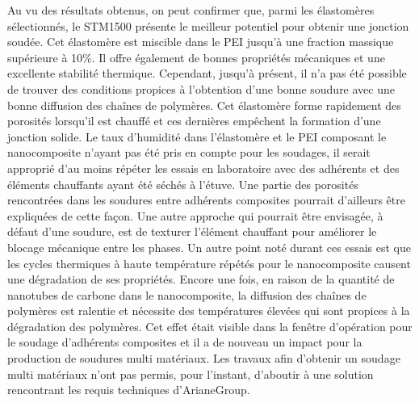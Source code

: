 Au vu des résultats obtenus, on peut confirmer que, parmi les élastomères sélectionnés, le STM1500 présente le meilleur potentiel pour obtenir une jonction soudée. 
Cet élastomère est miscible dans le PEI jusqu'à une fraction massique supérieure à 10\%. 
Il offre également de bonnes propriétés mécaniques et une excellente stabilité thermique. 
Cependant, jusqu'à présent, il n'a pas été possible de trouver des conditions propices à l'obtention d'une bonne soudure avec une bonne diffusion des chaînes de polymères. 
Cet élastomère forme rapidement des porosités lorsqu'il est chauffé et ces dernières empêchent la formation d'une jonction solide. 
Le taux d'humidité dans l'élastomère et le PEI composant le nanocomposite n'ayant pas été pris en compte pour les soudages, il serait approprié d'au moins répéter les essais en laboratoire avec des adhérents et des éléments chauffants ayant été séchés à l'étuve. 
Une partie des porosités rencontrées dans les soudures entre adhérents composites pourrait d'ailleurs être expliquées de cette façon. 
Une autre approche qui pourrait être envisagée, à défaut d'une soudure, est de texturer l'élément chauffant pour améliorer le blocage mécanique entre les phases. 
Un autre point noté durant ces essais est que les cycles thermiques à haute température répétés pour le nanocomposite causent une dégradation de ses propriétés. 
Encore une fois, en raison de la quantité de nanotubes de carbone dans le nanocomposite, la diffusion des chaînes de polymères est ralentie et nécessite des températures élevées qui sont propices à la dégradation des polymères. 
Cet effet était visible dans la fenêtre d'opération pour le soudage d'adhérents composites et il a de nouveau un impact pour la production de soudures multi matériaux. 
Les travaux afin d'obtenir un soudage multi matériaux n'ont pas permis, pour l'instant, d'aboutir à une solution rencontrant les requis techniques d'ArianeGroup. 